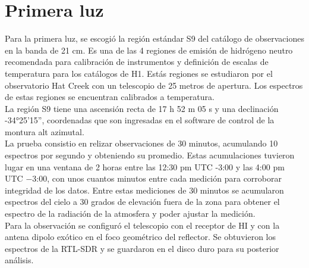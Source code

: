 \section{Primera luz}

Para la primera luz, se escogió la región estándar S9 del catálogo de observaciones en la banda de 21 cm. Es una de las 4 regiones de emisión de hidrógeno neutro recomendada para calibración de instrumentos y definición de escalas de temperatura para los catálogos de H1. Estás regiones se estudiaron por el observatorio Hat Creek con un telescopio de 25 metros de apertura. Los espectros de estas regiones se encuentran calibrados a temperatura.\\

La región S9 tiene una ascensión recta de 17 h 52 m 05 s y una declinación -34°25'15'', coordenadas que son ingresadas en el software de control de la montura alt azimutal.\\

La prueba consistio en relizar observaciones de 30 minutos, acumulando 10 espectros por segundo y obteniendo su promedio. Estas acumulaciones tuvieron lugar en una ventana de 2 horas entre las 12:30 pm UTC -3:00 y las 4:00 pm UTC $-$3:00, con unos cuantos minutos entre cada medición para corroborar integridad de los datos. Entre estas mediciones de 30 minutos se acumularon espectros del cielo a 30 grados de elevación fuera de la zona para obtener el espectro de la radiación de la atmosfera y poder ajustar la medición.\\

Para la observación se configuró el telescopio con el receptor de HI y con la antena dipolo exótico en el foco geométrico del reflector. Se obtuvieron los espectros de la RTL-SDR y se guardaron en el disco duro para su posterior análisis.\\